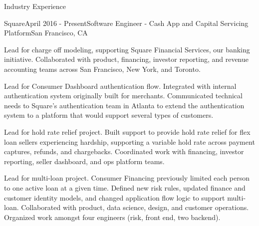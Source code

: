\documentclass{resume} %
\begin{document}
\begin{rSection}{Industry Experience}

\begin{rSubsection}{Square}{April 2016 - Present}{Software Engineer - Cash App and Capital Servicing Platform}{San Francisco, CA}

\item Lead for charge off modeling, supporting Square Financial Services, our banking initiative. Collaborated with product, financing, investor reporting, and revenue accounting teams across San Francisco, New York, and Toronto.
\item Lead for Consumer Dashboard authentication flow. Integrated with internal authentication system originally built for merchants. Communicated technical needs to Square's authentication team in Atlanta to extend the authentication system to a platform that would support several types of customers.
\item Lead for hold rate relief project. Built support to provide hold rate relief for flex loan sellers experiencing hardship, supporting a variable hold rate across payment captures, refunds, and chargebacks. Coordinated work with financing, investor reporting, seller dashboard, and ops platform teams.
\item Lead for multi-loan project. Consumer Financing previously limited each person to one active loan at a given time. Defined new risk rules, updated finance and customer identity models, and changed application flow logic to support multi-loan. Collaborated with product, data science, design, and customer operations. Organized work amongst four engineers (risk, front end, two backend).

\end{rSubsection}


%
%


\end{rSection}
\end{document}
